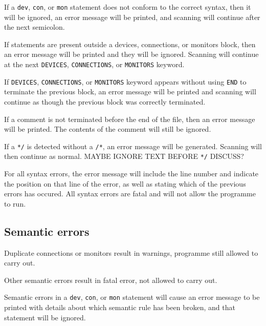 \documentclass[a4paper,10pt]{article}
\begin{document}
If a \texttt{dev}, \texttt{con}, or \texttt{mon} statement does not conform to the correct syntax, then it will be ignored, an error message will be printed, and scanning will continue after the next semicolon. 

If statements are present outside a devices, connections, or monitors block, then an error message will be printed and they will be ignored. Scanning will continue at the next \texttt{DEVICES}, \texttt{CONNECTIONS}, or \texttt{MONITORS} keyword. 

If \texttt{DEVICES}, \texttt{CONNECTIONS}, or \texttt{MONITORS} keyword appears without using \texttt{END} to terminate the previous block, an error message will be printed and scanning will continue as though the previous block was correctly terminated. 

If a comment is not terminated before the end of the file, then an error message will be printed. The contents of the comment will still be ignored.

If a \texttt{*/} is detected without a \texttt{/*}, an error message will be generated. Scanning will then continue as normal. MAYBE IGNORE TEXT BEFORE \texttt{*/} DISCUSS?

For all syntax errors, the error message will include the line number and indicate the position on that line of the error, as well as stating which of the previous errors has occured. All syntax errors are fatal and will not allow the programme to run.


\subsection{Semantic errors}

Duplicate connections or monitors result in warnings, programme still allowed to carry out.

Other semantic errors result in fatal error, not allowed to carry out.

Semantic errors in a \texttt{dev}, \texttt{con}, or \texttt{mon} statement will cause an error message to be printed with details about which semantic rule has been broken, and that statement will be ignored. 

\clearpage
\appendix
\end{document}
